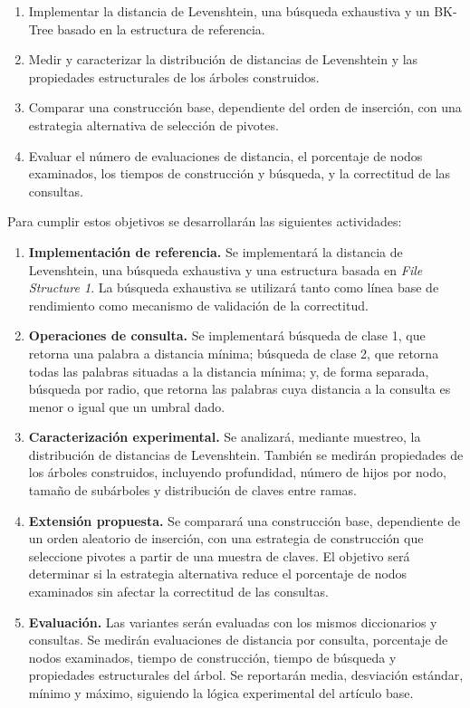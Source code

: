\documentclass[11pt]{article}
\begin{document}
\begin{enumerate}[leftmargin=1.4em]
\item Implementar la distancia de Levenshtein, una búsqueda exhaustiva y un
BK-Tree basado en la estructura de referencia.
\item Medir y caracterizar la distribución de distancias de Levenshtein y las
propiedades estructurales de los árboles construidos.
\item Comparar una construcción base, dependiente del orden de inserción, con
una estrategia alternativa de selección de pivotes.
\item Evaluar el número de evaluaciones de distancia, el porcentaje de nodos
examinados, los tiempos de construcción y búsqueda, y la correctitud de las
consultas.
\end{enumerate}

Para cumplir estos objetivos se desarrollarán las siguientes actividades: 

\begin{enumerate}[leftmargin=1.4em] 
\item \textbf{Implementación de referencia.} Se implementará la distancia de Levenshtein, una búsqueda exhaustiva y una estructura basada en \emph{File Structure 1}. La búsqueda exhaustiva se utilizará tanto como línea base de rendimiento como mecanismo de validación de la correctitud. 

\item \textbf{Operaciones de consulta.} Se implementará búsqueda de clase 1, que retorna una palabra a distancia mínima; búsqueda de clase 2, que retorna todas las palabras situadas a la distancia mínima; y, de forma separada, búsqueda por radio, que retorna las palabras cuya distancia a la consulta es menor o igual que un umbral dado. 

\item \textbf{Caracterización experimental.} Se analizará, mediante muestreo, la distribución de distancias de Levenshtein. También se medirán propiedades de los árboles construidos, incluyendo profundidad, número de hijos por nodo, tamaño de subárboles y distribución de claves entre ramas. 

\item \textbf{Extensión propuesta.} Se comparará una construcción base, dependiente de un orden aleatorio de inserción, con una estrategia de construcción que seleccione pivotes a partir de una muestra de claves. El objetivo será determinar si la estrategia alternativa reduce el porcentaje de nodos examinados sin afectar la correctitud de las consultas. 

\item \textbf{Evaluación.} Las variantes serán evaluadas con los mismos diccionarios y consultas. Se medirán evaluaciones de distancia por consulta, porcentaje de nodos examinados, tiempo de construcción, tiempo de búsqueda y propiedades estructurales del árbol. Se reportarán media, desviación estándar, mínimo y máximo, siguiendo la lógica experimental del artículo base. 

\end{enumerate}
\end{document}
